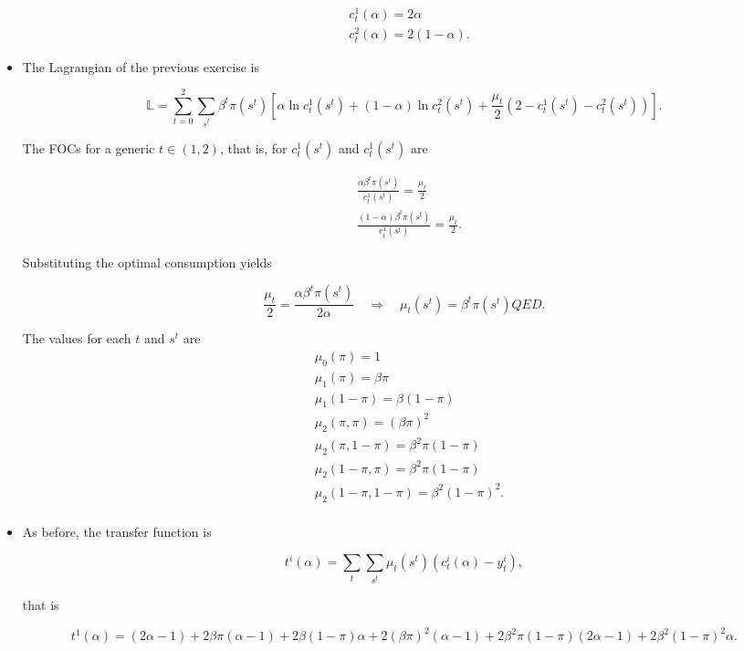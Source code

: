\documentclass[12pt,a4paper]{article}
\begin{document}
\begin{itemize}
    \begin{align*}
      & c_t^1 (\alpha) = 2 \alpha \\
      & c_t^2 (\alpha) = 2(1-\alpha).
    \end{align*}

  \item The Lagrangian of the previous exercise is

    $$
      \mathbb{L} = \sum^2_{t=0} \sum_{s^t} \beta^t \pi(s^t) \left[ \alpha \ln c_t^1(s^t) + (1-\alpha) \ln c_t^2(s^t) + \frac{\mu_t}{2} \left(2 - c^1_t(s^t) - c_t^2(s^t) \right)\right].
    $$

  The FOCs for a generic $t \in (1, 2)$, that is, for $c_t^1(s^t)$ and $c_t^1(s^t)$ are

  \begin{align*}
    & \frac{\alpha\beta^t \pi(s^t)}{c_t^1(s^t)} = \frac{\mu_t}{2} \\
    & \frac{(1 -\alpha)\beta^t \pi(s^t)}{c_t^1(s^t)} = \frac{\mu_t}{2}.
  \end{align*}

Substituting the optimal consumption yields

  $$
    \frac{\mu_t}{2} = \frac{\alpha\beta^t \pi(s^t)}{ 2 \alpha} \quad \Rightarrow \quad \mu_t(s^t) = \beta^t \pi(s^t) QED.$$

  The values for each $t$ and $s^t$ are
  \begin{align*}
    & \mu_0(\pi)  = 1 \\
    & \mu_1(\pi)  = \beta \pi \\
    & \mu_1(1 - \pi)  = \beta (1 - \pi) \\
    & \mu_2(\pi, \pi)  = (\beta \pi)^2 \\
    & \mu_2(\pi, 1 - \pi)  = \beta^2 \pi (1 - \pi) \\
    & \mu_2(1 - \pi, \pi)  = \beta^2 \pi (1 - \pi) \\
    & \mu_2(1 - \pi, 1 - \pi)  = \beta^2 (1 - \pi)^2. \\
  \end{align*}

  \item As before, the transfer function is

    $$
      t^i(\alpha) = \sum_{t} \sum_{s^t} \mu_t(s^t) \left( c_t^i(\alpha)- y_t^i \right),
    $$

  that is

    $$
    t^1(\alpha) = (2\alpha - 1) + 2\beta \pi(\alpha - 1) + 2\beta (1 - \pi)\alpha + 2(\beta \pi)^2 (\alpha - 1) + 2 \beta^2 \pi (1 - \pi) (2 \alpha - 1) + 2 \beta^2 (1 - \pi)^2 \alpha.
    $$


\end{itemize}
\end{document}

